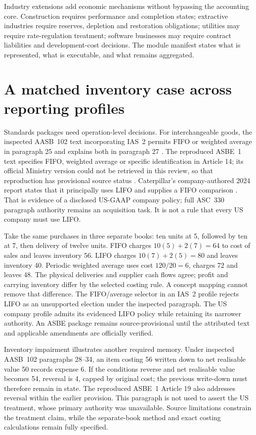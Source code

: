 Industry extensions add economic mechanisms without bypassing the accounting
core. Construction requires performance and completion states; extractive
industries require reserves, depletion and restoration obligations; utilities
may require rate-regulation treatment; software businesses may require
contract liabilities and development-cost decisions. The module manifest
states what is represented, what is executable, and what remains aggregated.

\section{A matched inventory case across reporting profiles}

Standards packages need operation-level decisions. For interchangeable goods,
the inspected AASB~102 text incorporating IAS~2 permits FIFO or weighted
average in paragraph 25 and explains both in paragraph 27
\citep{aasb102}. The reproduced ASBE~1 text specifies FIFO, weighted average
or specific identification in Article 14; its official Ministry version could
not be retrieved in this review, so that reproduction has provisional source
status \citep{asbe1copy}. Caterpillar's company-authored 2024 report states
that it principally uses LIFO and supplies a FIFO comparison
\citep[Note 1.C]{caterpillar2024}. That is evidence of a disclosed US-GAAP
company policy; full ASC~330 paragraph authority remains an acquisition task.
It is not a rule that every US company must use LIFO.

Take the same purchases in three separate books: ten units at 5, followed by
ten at 7, then delivery of twelve units. FIFO charges $10(5)+2(7)=64$ to
cost of sales and leaves inventory 56. LIFO charges $10(7)+2(5)=80$ and
leaves inventory 40. Periodic weighted average uses cost $120/20=6$, charges
72 and leaves 48. The physical deliveries and supplier cash flows agree;
profit and carrying inventory differ by the selected costing rule. A concept
mapping cannot remove that difference. The FIFO/average selector in an
IAS~2 profile rejects LIFO as an unsupported election under the inspected
paragraph. The US company profile admits its evidenced LIFO policy while
retaining its narrower authority. An ASBE package remains source-provisional
until the attributed text and applicable amendments are officially verified.

Inventory impairment illustrates another required memory. Under inspected
AASB~102 paragraphs 28--34, an item costing 56 written down to net realisable
value 50 records expense 6. If the conditions reverse and net realisable
value becomes 54, reversal is 4, capped by original cost; the previous
write-down must therefore remain in state. The reproduced ASBE~1 Article 19
also addresses reversal within the earlier provision. This paragraph is not
used to assert the US treatment, whose primary authority was unavailable.
Source limitations constrain the treatment claim, while the separate-book
method and exact costing calculations remain fully specified.









